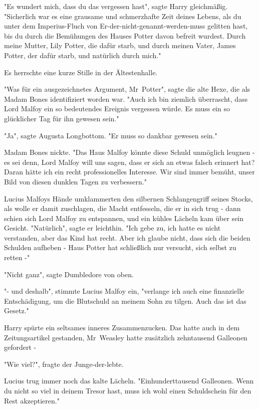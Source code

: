 {"Es wundert mich, dass du das vergessen hast", sagte Harry gleichmäßig. "Sicherlich war es eine grausame und schmerzhafte Zeit deines Lebens, als du unter dem Imperius-Fluch von Er-der-nicht-genannt-werden-muss gelitten hast, bis du durch die Bemühungen des Hauses Potter davon befreit wurdest. Durch meine Mutter, Lily Potter, die dafür starb, und durch meinen Vater, James Potter, der dafür starb, und natürlich durch mich."

Es herrschte eine kurze Stille in der Ältestenhalle.

"Was für ein ausgezeichnetes Argument, Mr~Potter", sagte die alte Hexe, die als Madam Bones identifiziert worden war. "Auch ich bin ziemlich überrascht, dass Lord Malfoy ein so bedeutendes Ereignis vergessen würde. Es muss ein so glücklicher Tag für ihn gewesen sein."

"Ja", sagte Augusta Longbottom. "Er muss so dankbar gewesen sein."

Madam Bones nickte. "Das Haus Malfoy könnte diese Schuld unmöglich leugnen - es sei denn, Lord Malfoy will uns sagen, dass er sich an etwas falsch erinnert hat? Daran hätte ich ein recht professionelles Interesse. Wir sind immer bemüht, unser Bild von diesen dunklen Tagen zu verbessern."

Lucius Malfoys Hände umklammerten den silbernen Schlangengriff seines Stocks, als wolle er damit zuschlagen, die Macht entfesseln, die er in sich trug - dann schien sich Lord Malfoy zu entspannen, und ein kühles Lächeln kam über sein Gesicht. "Natürlich", sagte er leichthin. "Ich gebe zu, ich hatte es nicht verstanden, aber das Kind hat recht. Aber ich glaube nicht, dass sich die beiden Schulden aufheben - Haus Potter hat schließlich nur versucht, sich selbst zu retten -"

"Nicht ganz", sagte Dumbledore von oben.

"- und deshalb", stimmte Lucius Malfoy ein, "verlange ich auch eine finanzielle Entschädigung, um die Blutschuld an meinem Sohn zu tilgen. Auch das ist das Gesetz."

Harry spürte ein seltsames inneres Zusammenzucken. Das hatte auch in dem Zeitungsartikel gestanden, Mr~Weasley hatte zusätzlich zehntausend Galleonen gefordert -

"Wie viel?", fragte der Junge-der-lebte.

Lucius trug immer noch das kalte Lächeln. "Einhunderttausend Galleonen. Wenn du nicht so viel in deinem Tresor hast, muss ich wohl einen Schuldschein für den Rest akzeptieren."

}
